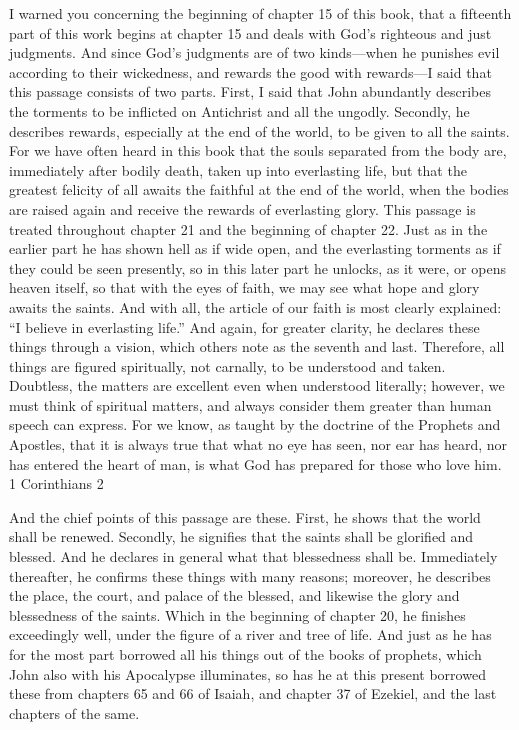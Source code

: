 I warned you concerning the beginning of chapter 15 of this book, that a fifteenth part of this work begins at chapter 15 and deals with God’s righteous and just judgments. And since God’s judgments are of two kinds—when he punishes evil according to their wickedness, and rewards the good with rewards—I said that this passage consists of two parts. First, I said that John abundantly describes the torments to be inflicted on Antichrist and all the ungodly. Secondly, he describes rewards, especially at the end of the world, to be given to all the saints. For we have often heard in this book that the souls separated from the body are, immediately after bodily death, taken up into everlasting life, but that the greatest felicity of all awaits the faithful at the end of the world, when the bodies are raised again and receive the rewards of everlasting glory. This passage is treated throughout chapter 21 and the beginning of chapter 22. Just as in the earlier part he has shown hell as if wide open, and the everlasting torments as if they could be seen presently, so in this later part he unlocks, as it were, or opens heaven itself, so that with the eyes of faith, we may see what hope and glory awaits the saints. And with all, the article of our faith is most clearly explained: “I believe in everlasting life.” And again, for greater clarity, he declares these things through a vision, which others note as the seventh and last. Therefore, all things are figured spiritually, not carnally, to be understood and taken. Doubtless, the matters are excellent even when understood literally; however, we must think of spiritual matters, and always consider them greater than human speech can express. For we know, as taught by the doctrine of the Prophets and Apostles, that it is always true that what no eye has seen, nor ear has heard, nor has entered the heart of man, is what God has prepared for those who love him. 1 Corinthians 2

And the chief points of this passage are these. First, he shows that the world shall be renewed. Secondly, he signifies that the saints shall be glorified and blessed. And he declares in general what that blessedness shall be. Immediately thereafter, he confirms these things with many reasons; moreover, he describes the place, the court, and palace of the blessed, and likewise the glory and blessedness of the saints. Which in the beginning of chapter 20, he finishes exceedingly well, under the figure of a river and tree of life. And just as he has for the most part borrowed all his things out of the books of prophets, which John also with his Apocalypse illuminates, so has he at this present borrowed these from chapters 65 and 66 of Isaiah, and chapter 37 of Ezekiel, and the last chapters of the same.

